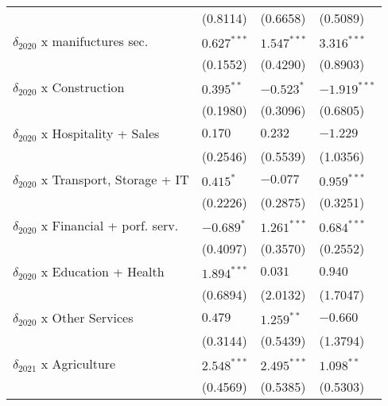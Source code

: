\begin{tabular}{llll}
                                                   &           (0.8114) &           (0.6658) &           (0.5089) \\
$\delta_{2020}$ x manifuctures sec.                &      $0.627^{***}$ &      $1.547^{***}$ &      $3.316^{***}$ \\
                                                   &           (0.1552) &           (0.4290) &           (0.8903) \\
$\delta_{2020}$ x Construction                     &       $0.395^{**}$ &         $-0.523^*$ &     $-1.919^{***}$ \\
                                                   &           (0.1980) &           (0.3096) &           (0.6805) \\
$\delta_{2020}$ x Hospitality + Sales              &            $0.170$ &            $0.232$ &           $-1.229$ \\
                                                   &           (0.2546) &           (0.5539) &           (1.0356) \\
$\delta_{2020}$ x Transport, Storage + IT          &          $0.415^*$ &           $-0.077$ &      $0.959^{***}$ \\
                                                   &           (0.2226) &           (0.2875) &           (0.3251) \\
$\delta_{2020}$ x Financial + porf. serv.          &         $-0.689^*$ &      $1.261^{***}$ &      $0.684^{***}$ \\
                                                   &           (0.4097) &           (0.3570) &           (0.2552) \\
$\delta_{2020}$ x Education + Health               &      $1.894^{***}$ &            $0.031$ &            $0.940$ \\
                                                   &           (0.6894) &           (2.0132) &           (1.7047) \\
$\delta_{2020}$ x Other Services                   &            $0.479$ &       $1.259^{**}$ &           $-0.660$ \\
                                                   &           (0.3144) &           (0.5439) &           (1.3794) \\
$\delta_{2021}$ x Agriculture                      &      $2.548^{***}$ &      $2.495^{***}$ &       $1.098^{**}$ \\
                                                   &           (0.4569) &           (0.5385) &           (0.5303) \\

\end{tabular}
